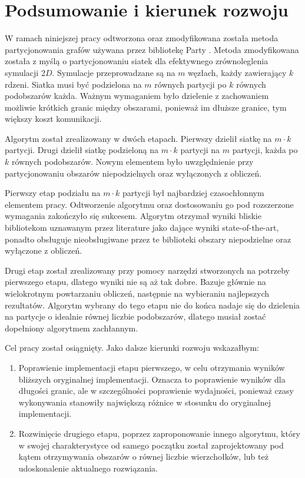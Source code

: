\newpage
\section{Podsumowanie i kierunek rozwoju}

W ramach niniejszej pracy odtworzona oraz zmodyfikowana została metoda partycjonowania grafów używana przez
bibliotekę Party \cite{1364754}.
Metoda zmodyfikowana została z myślą o partycjonowaniu siatek dla efektywnego zrównoleglenia symulacji 2$D$.
Symulacje przeprowadzane są na $m$ węzłach, każdy zawierający $k$ rdzeni.
Siatka musi być podzielona na $m$ równych partycji po $k$ równych podobszarów każda.
Ważnym wymaganiem było dzielenie z zachowaniem możliwie krótkich granic między obszarami, ponieważ im dłuższe granice,
tym większy koszt komunikacji.

Algorytm został zrealizowany w dwóch etapach.
Pierwszy dzielił siatkę na $m \cdot k$ partycji.
Drugi dzielił siatkę podzieloną na $m \cdot k$ partycji na $m$ partycji, każda po $k$ równych podobszarów.
Nowym elementem było uwzględnienie przy partycjonowaniu obszarów niepodzielnych oraz wyłączonych
z obliczeń.

Pierwszy etap podziału na $m \cdot k$ partycji był najbardziej czasochłonnym elementem pracy.
Odtworzenie algorytmu oraz dostosowaniu go pod rozszerzone wymagania zakończyło się sukcesem.
Algorytm otrzymał wyniki bliskie bibliotekom uznawanym przez literature jako dające wyniki state-of-the-art,
ponadto obsługuje nieobsługiwane przez te biblioteki obszary niepodzielne oraz wyłączone z obliczeń.

Drugi etap został zrealizowany przy pomocy narzędzi stworzonych na potrzeby pierwszego etapu, dlatego wyniki nie są
aż tak dobre.
Bazuje głównie na wielokrotnym powtarzaniu obliczeń, następnie na wybieraniu najlepszych rezultatów.
Algorytm wybrany do tego etapu nie do końca nadaje się do dzielenia na partycje o idealnie równej liczbie podobszarów,
dlatego musiał zostać dopełniony algorytmem zachłannym.

Cel pracy został osiągnięty.
Jako dalsze kierunki rozwoju wskazałbym:
\begin{enumerate}
    \item {Poprawienie implementacji etapu pierwszego, w celu otrzymania wyników bliższych oryginalnej implementacji.
    Oznacza to poprawienie wyników dla długości granic, ale w szczególności poprawienie wydajności,
    ponieważ czasy wykonywania stanowiły największą różnice w stosunku do oryginalnej implementacji.}
    \item {Rozwinięcie drugiego etapu, poprzez zaproponowanie innego algorytmu, który w swojej charakterystyce
    od samego początku został zaprojektowany pod kątem otrzymywania obszarów o równej liczbie wierzchołków, lub też
    udoskonalenie aktualnego rozwiązania.}
\end{enumerate}